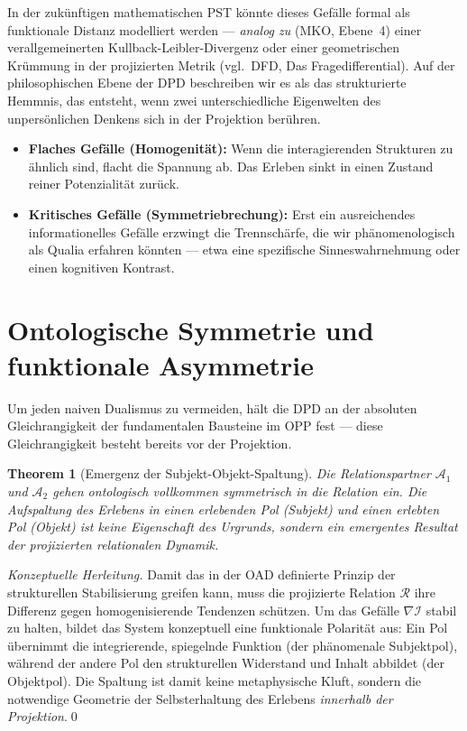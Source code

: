 \documentclass[11pt,a4paper]{article}
\theoremstyle{plain}
\newtheorem{theorem}{Theorem}[section]
\theoremstyle{definition}
\begin{document}
In der zuk\"{u}nftigen mathematischen PST k\"{o}nnte dieses Gef\"{a}lle formal als
funktionale Distanz modelliert werden --- \emph{analog zu} (MKO, Ebene~4) einer
verallgemeinerten Kullback-Leibler-Divergenz oder einer geometrischen Kr\"{u}mmung in
der projizierten Metrik (vgl.\ DFD, Das Fragedifferential). Auf der philosophischen
Ebene der DPD beschreiben wir es als das strukturierte Hemmnis, das entsteht, wenn zwei
unterschiedliche Eigenwelten des unpers\"{o}nlichen Denkens sich in der Projektion
ber\"{u}hren.

\begin{itemize}
  \item \textbf{Flaches Gef\"{a}lle (Homogenit\"{a}t):} Wenn die interagierenden
        Strukturen zu \"{a}hnlich sind, flacht die Spannung ab. Das Erleben sinkt in
        einen Zustand reiner Potenzialit\"{a}t zur\"{u}ck.
  \item \textbf{Kritisches Gef\"{a}lle (Symmetriebrechung):} Erst ein ausreichendes
        informationelles Gef\"{a}lle erzwingt die Trennsch\"{a}rfe, die wir
        ph\"{a}nomenologisch als Qualia erfahren k\"{o}nnten --- etwa eine spezifische
        Sinneswahrnehmung oder einen kognitiven Kontrast.
\end{itemize}

\section{Ontologische Symmetrie und funktionale Asymmetrie}

Um jeden naiven Dualismus zu vermeiden, h\"{a}lt die DPD an der absoluten Gleichrangigkeit
der fundamentalen Bausteine im OPP fest --- diese Gleichrangigkeit besteht bereits vor
der Projektion.

\begin{theorem}[Emergenz der Subjekt-Objekt-Spaltung]
Die Relationspartner $\mathcal{A}_1$ und $\mathcal{A}_2$ gehen ontologisch vollkommen
symmetrisch in die Relation ein. Die Aufspaltung des Erlebens in einen erlebenden Pol
(Subjekt) und einen erlebten Pol (Objekt) ist keine Eigenschaft des Urgrunds, sondern
ein emergentes Resultat der projizierten relationalen Dynamik.
\end{theorem}

\begin{proof}[Konzeptuelle Herleitung]
Damit das in der OAD definierte Prinzip der strukturellen Stabilisierung greifen kann,
muss die projizierte Relation $\mathcal{R}$ ihre Differenz gegen homogenisierende
Tendenzen sch\"{u}tzen. Um das Gef\"{a}lle $\nabla \mathcal{I}$ stabil zu halten, bildet
das System konzeptuell eine funktionale Polarit\"{a}t aus: Ein Pol \"{u}bernimmt die
integrierende, spiegelnde Funktion (der ph\"{a}nomenale Subjektpol), w\"{a}hrend der
andere Pol den strukturellen Widerstand und Inhalt abbildet (der Objektpol). Die
Spaltung ist damit keine metaphysische Kluft, sondern die notwendige Geometrie der
Selbsterhaltung des Erlebens \emph{innerhalb der Projektion}.\qed
\end{proof}
\end{document}
